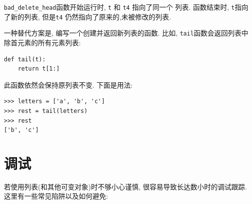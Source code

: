 \documentclass[10pt]{book}
\begin{document}
\verb"bad_delete_head"函数开始运行时, {\tt t} 和 {\tt t4} 指向了同一个
列表. 函数结束时, {\tt t}指向了新的列表, 
但是{\tt t4} 仍然指向了原来的,未被修改的列表.

一种替代方案是, 编写一个创建并返回新列表的函数. 比如, 
{\tt tail}函数会返回列表中除首元素的所有元素列表:

\begin{verbatim}
def tail(t):
    return t[1:]
\end{verbatim}
%
此函数依然会保持原列表不变. 下面是用法:

\begin{verbatim}
>>> letters = ['a', 'b', 'c']
>>> rest = tail(letters)
>>> rest
['b', 'c']
\end{verbatim}



\section{调试}

若使用列表(和其他可变对象)时不够小心谨慎, 很容易导致长达数小时的调试跟踪. 
这里有一些常见陷阱以及如何避免:
\end{document}
